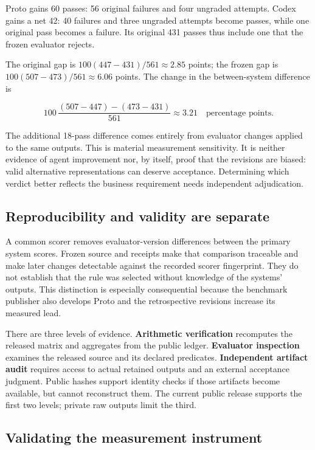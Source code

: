 

Proto gains 60 passes: 56 original failures and four ungraded attempts. Codex gains a net 42: 40 failures and three ungraded attempts become passes, while one original pass becomes a failure. Its original 431 passes thus include one that the frozen evaluator rejects.

The original gap is \(100(447-431)/561\approx2.85\) points; the frozen gap is \(100(507-473)/561\approx6.06\) points. The change in the between-system difference is

\[
100\,\frac{(507-447)-(473-431)}{561}\approx3.21
\quad\text{percentage points}.
\]

The additional 18-pass difference comes entirely from evaluator changes applied to the same outputs. This is material measurement sensitivity. It is neither evidence of agent improvement nor, by itself, proof that the revisions are biased: valid alternative representations can deserve acceptance. Determining which verdict better reflects the business requirement needs independent adjudication.

\subsection{Reproducibility and validity are separate}\label{reproducibility-and-validity-are-separate}

A common scorer removes evaluator-version differences between the primary system scores. Frozen source and receipts make that comparison traceable and make later changes detectable against the recorded scorer fingerprint. They do not establish that the rule was selected without knowledge of the systems' outputs. This distinction is especially consequential because the benchmark publisher also develops Proto and the retrospective revisions increase its measured lead.

There are three levels of evidence. \textbf{Arithmetic verification} recomputes the released matrix and aggregates from the public ledger. \textbf{Evaluator inspection} examines the released source and its declared predicates. \textbf{Independent artifact audit} requires access to actual retained outputs and an external acceptance judgment. Public hashes support identity checks if those artifacts become available, but cannot reconstruct them. The current public release supports the first two levels; private raw outputs limit the third.

\subsection{Validating the measurement instrument}\label{validating-the-measurement-instrument}

